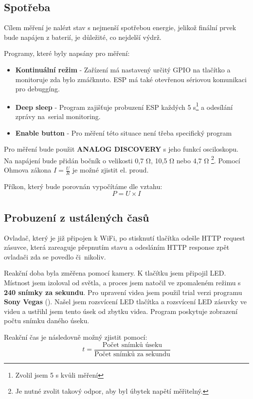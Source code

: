 \documentclass[a4paper, 12pt]{report}
\begin{document}
    \subsection{Spotřeba}
    \label{subsec:ustalene-stavy-spotreba}
    Cílem měření je nalézt stav s nejmenší spotřebou energie, jelikož finální prvek bude napájen z baterií, je důležité, co nejdelší výdrž.\par
    Programy, které byly napsány pro měření:
    \begin{itemize}
        \item \textbf{Kontinuální režim} - Zařízení má nastavený určitý GPIO na tlačítko a monitoruje zda bylo zmáčknuto.
        ESP má také otevřenou sériovou komunikaci pro debuggíng.
        \item \textbf{Deep sleep} - Program zajišťuje probuzení ESP každých 5 \si{s}\footnote{Zvolil jsem 5 s kvůli měření} a odesílání zprávy na~serial monitoring.
        \item \textbf{Enable button} - Pro měření této situace není třeba specifický program
    \end{itemize}
    Pro měření bude použit \textbf{ANALOG DISCOVERY} s jeho funkcí osciloskopu.
    Na napájení bude přidán bočník o velikosti 0,7 \si{\ohm}, 10,5 \si{\ohm} nebo 4,7 \si{\ohm} \footnote{Je nutné zvolit takový odpor, aby byl úbytek napětí měřitelný.}.
    Pomocí Ohmova zákona $ I = \frac{U}{R} $ je možné zjistit el. proud. \par
    Příkon, který bude porovnán vypočítáme dle vztahu:
    \[P = U \times I\]

    \subsection{Probuzení z ustálených časů}
    \label{subsec:ustalene-stavy-reakce}
    Ovladač, který je již připojen k WiFi, po stisknutí tlačítka odešle HTTP request zásuvce, která zareaguje přepnutím stavu a odesláním HTTP response zpět ovladači zda se povedlo či~nikoliv.\par
    Reakční doba byla změřena pomocí kamery.
    K tlačítku jsem připojil LED. Místnost jsem izoloval od světla, a proces jsem natočil ve zpomaleném režimu s \textbf{240 snímky za sekundu}.
    Pro upravení videa jsem použil trial verzi programu \textbf{Sony Vegas} ().
    Našel jsem rozsvícení LED tlačítka a rozsvícení LED zásuvky ve videu a ustřihl jsem tento úsek od zbytku videa.
    Program poskytuje zobrazení počtu snímku daného úseku.\par
    Reakční čas je následovně možný zjistit pomocí:
    \[ t = \frac{\textrm{Počet snímků úseku}}{\textrm{Počet snímků za sekundu}}\]
\end{document}
